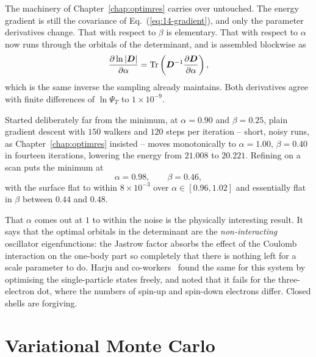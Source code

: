 The machinery of Chapter~\ref{chap:optimres} carries over untouched.  The
energy gradient is still the covariance of Eq.~(\ref{eq:14-gradient}), and only
the parameter derivatives change.  That with respect to $\beta$ is elementary.
That with respect to $\alpha$ now runs through the orbitals of the determinant,
and is assembled blockwise as
\begin{equation}
  \frac{\partial \ln{|\boldsymbol{D}|}}{\partial \alpha}
   = \mathrm{Tr}\left(\bm{D}^{-1}\frac{\partial \bm{D}}{\partial\alpha}\right),
  \label{eq:16-alphagradient}
\end{equation}
which is the same inverse the sampling already maintains.  Both derivatives
agree with finite differences of $\ln\Psi_T$ to $1\times10^{-9}$.

Started deliberately far from the minimum, at $\alpha=0.90$ and $\beta=0.25$,
plain gradient descent with $150$ walkers and $120$ steps per iteration --
short, noisy runs, as Chapter~\ref{chap:optimres} insisted -- moves
monotonically to $\alpha=1.00$, $\beta=0.40$ in fourteen iterations, lowering
the energy from $21.008$ to $20.221$.  Refining on a scan puts the minimum at
\begin{equation}
  \alpha = 0.98, \qquad \beta = 0.46 ,
  \label{eq:16-optimum}
\end{equation}
with the surface flat to within $8\times10^{-3}$ over
$\alpha\in[0.96,1.02]$ and essentially flat in $\beta$ between $0.44$ and
$0.48$.

\begin{svgraybox}
That $\alpha$ comes out at $1$ to within the noise is the physically
interesting result.  It says that the optimal orbitals in the determinant are
the \emph{non-interacting} oscillator eigenfunctions: the Jastrow factor
absorbs the effect of the Coulomb interaction on the one-body part so
completely that there is nothing left for a scale parameter to do.  Harju and
co-workers~\cite{harju2002} found the same for this system by optimising the
single-particle states freely, and noted that it fails for the three-electron
dot, where the numbers of spin-up and spin-down electrons differ.  Closed
shells are forgiving.
\end{svgraybox}

\section{Variational Monte Carlo}
\label{sec:appvmc}

